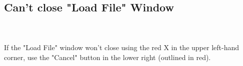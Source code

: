 \subsection{Can't close "Load File" Window}

\begin{minipage}{\linewidth}
        \label{fig: LoadFile} 
\end{minipage}

~\\~\\
If the "Load File" window won't close using the red X in the upper left-hand corner, 
use the "Cancel" button in the lower right (outlined in red). 




